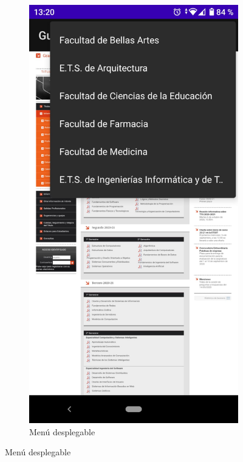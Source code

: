 \documentclass[a4paper,11pt]{article}
\begin{document}
\begin{figure}[H]
\begin{subfigure}{0.5\textwidth}
  \centering
  \includegraphics[width=1\linewidth]{imagenes/menu.jpeg}  
  \caption{Menú desplegable}

\end{subfigure}
\end{figure}
\end{document}

